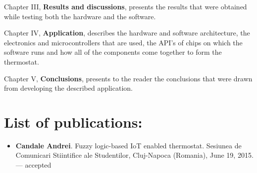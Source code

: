 \qquad Chapter III, \textbf{Results and discussions}, presents the results that were obtained while testing
both the hardware and the software.

\qquad Chapter IV, \textbf{Application}, describes the hardware and software architecture, the electronics
and microcontrollers that are used, the API's of chips on which the software runs and how all of the
components come together to form the thermostat.

\quad Chapter V, \textbf{Conclusions}, presents to the reader the conclusions that were drawn from developing
the described application.

\section*{List of publications:}

\begin{itemize}
    \item \textbf{Candale Andrei}. Fuzzy logic-based IoT enabled thermostat. Sesiunea de Comunicari
    Stiintifice ale Studentilor, Cluj-Napoca (Romania), June 19, 2015. --- accepted
\end{itemize}
